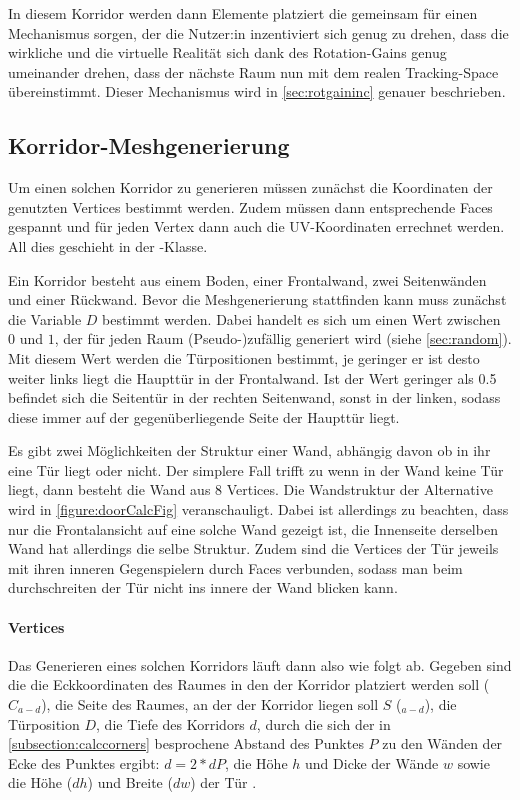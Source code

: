 In diesem Korridor werden dann Elemente platziert die gemeinsam für einen Mechanismus sorgen, der die Nutzer:in inzentiviert sich genug zu drehen, dass die wirkliche und die virtuelle Realität sich dank des Rotation-Gains genug umeinander drehen, dass der nächste Raum nun mit dem realen Tracking-Space übereinstimmt. Dieser Mechanismus wird in
\autoref{sec:rotgaininc}
genauer beschrieben.

\subsection{Korridor-Meshgenerierung}
\label{subsec:corridormesh}
Um einen solchen Korridor zu generieren müssen zunächst die Koordinaten der genutzten Vertices %
bestimmt werden. Zudem müssen dann entsprechende Faces gespannt und für jeden Vertex dann auch die UV-Koordinaten errechnet werden. All dies geschieht in der -Klasse.

Ein Korridor besteht aus einem Boden, einer Frontalwand, zwei Seitenwänden und einer Rückwand.
Bevor die Meshgenerierung stattfinden kann muss zunächst die Variable $D$ bestimmt werden. Dabei handelt es sich um einen Wert zwischen $0$ und $1$, der für jeden Raum (Pseudo-)zufällig generiert wird (siehe \autoref{sec:random}). Mit diesem Wert werden die Türpositionen bestimmt, je geringer er ist desto weiter links liegt die Haupttür in der Frontalwand. Ist der Wert geringer als 0.5 befindet sich die Seitentür in der rechten Seitenwand, sonst in der linken, sodass diese immer auf der gegenüberliegende Seite der Haupttür liegt.

Es gibt zwei Möglichkeiten der Struktur einer Wand, abhängig davon ob in ihr eine Tür liegt oder nicht. Der simplere Fall trifft zu wenn in der Wand keine Tür liegt, dann besteht die Wand aus 8 Vertices.
Die Wandstruktur der Alternative wird in \autoref{figure:doorCalcFig}
veranschauligt. Dabei ist allerdings zu beachten, dass nur die Frontalansicht auf eine solche Wand gezeigt ist, die Innenseite derselben Wand hat allerdings die selbe Struktur. Zudem sind die Vertices der Tür jeweils mit ihren inneren Gegenspielern durch Faces verbunden, sodass man beim durchschreiten der Tür nicht ins innere der Wand blicken kann.

\paragraph*{Vertices}

Das Generieren eines solchen Korridors läuft dann also wie folgt ab. Gegeben sind die die Eckkoordinaten des Raumes in den der Korridor platziert werden soll ($C_{a-d}$), die Seite des Raumes, an der der Korridor liegen soll $S$ ($_{a-d}$), die Türposition $D$, die Tiefe des Korridors $d$, durch die sich der in \autoref{subsection:calccorners} besprochene Abstand des Punktes $P$ zu den Wänden der Ecke des Punktes ergibt: $d = 2 * dP$, die Höhe $h$ und Dicke der Wände $w$ sowie die Höhe ($dh$) und Breite ($dw$) der Tür .

